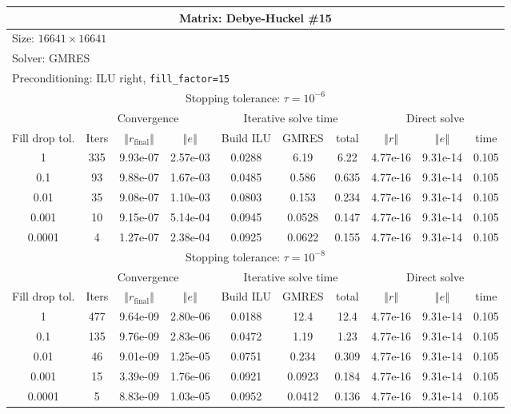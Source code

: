 \documentclass[oneside,final]{amsart}  %
\begin{document}
\begin{tabular}{|c|c|c|c|c|c|c|c|c|c|}
\hline
\multicolumn{10}{|c|}{Matrix: Debye-Huckel \#15}\tabularnewline
\hline
  \multicolumn{10}{|l|}{Size: $16641\times16641$}\tabularnewline
\hline
\multicolumn{10}{|l|}{Solver: GMRES}\tabularnewline
\hline
\multicolumn{10}{|l|}{Preconditioning: ILU right, \texttt{fill\_factor=15}}\tabularnewline
\hline
\hline
\multicolumn{10}{|c|}{Stopping tolerance: $\tau=10^{-6}$}\tabularnewline
\hline
\hline
 & \multicolumn{3}{c|}{Convergence} & \multicolumn{3}{c|}{Iterative solve time} & \multicolumn{3}{c|}{Direct solve}\tabularnewline
\hline
Fill drop tol.  & Iters & $\left\Vert r_{\text{final}}\right\Vert $  & $\left\Vert e\right\Vert $  & Build ILU  & GMRES  & total  & $\left\Vert r\right\Vert $ & $\left\Vert e\right\Vert $  & time\tabularnewline
\hline
1      & 335 & 9.93e-07 & 2.57e-03 &  0.0288 &    6.19 &    6.22 & 4.77e-16 & 9.31e-14 &     0.105\\
  \hline
0.1    & 93  & 9.88e-07 & 1.67e-03 &  0.0485 &   0.586 &   0.635 & 4.77e-16 & 9.31e-14 &     0.105\\
  \hline
0.01   & 35  & 9.08e-07 & 1.10e-03 &  0.0803 &   0.153 &   0.234 & 4.77e-16 & 9.31e-14 &     0.105\\
  \hline
0.001  & 10  & 9.15e-07 & 5.14e-04 &  0.0945 &  0.0528 &   0.147 & 4.77e-16 & 9.31e-14 &     0.105\\
  \hline
0.0001 & 4   & 1.27e-07 & 2.38e-04 &  0.0925 &  0.0622 &   0.155 & 4.77e-16 & 9.31e-14 &     0.105\\
  \hline
\hline
\multicolumn{10}{|c|}{Stopping tolerance: $\tau=10^{-8}$}\tabularnewline
\hline
\hline
 & \multicolumn{3}{c|}{Convergence} & \multicolumn{3}{c|}{Iterative solve time} & \multicolumn{3}{c|}{Direct solve }\tabularnewline
\hline
Fill drop tol.  & Iters  & $\left\Vert r_{\text{final}}\right\Vert $  & $\left\Vert e\right\Vert $ & Build ILU  & GMRES  & total  & $\left\Vert r\right\Vert $  & $\left\Vert e\right\Vert $  & time\tabularnewline
\hline
1      & 477 & 9.64e-09 & 2.80e-06 &  0.0188 &    12.4 &    12.4 & 4.77e-16 & 9.31e-14 &     0.105\\
  \hline
0.1    & 135 & 9.76e-09 & 2.83e-06 &  0.0472 &    1.19 &    1.23 & 4.77e-16 & 9.31e-14 &     0.105\\
  \hline
0.01   & 46  & 9.01e-09 & 1.25e-05 &  0.0751 &   0.234 &   0.309 & 4.77e-16 & 9.31e-14 &     0.105\\
  \hline
0.001  & 15  & 3.39e-09 & 1.76e-06 &  0.0921 &  0.0923 &   0.184 & 4.77e-16 & 9.31e-14 &     0.105\\
  \hline
0.0001 & 5   & 8.83e-09 & 1.03e-05 &  0.0952 &  0.0412 &   0.136 & 4.77e-16 & 9.31e-14 &     0.105\\
  \hline
\end{tabular}
\end{document}
